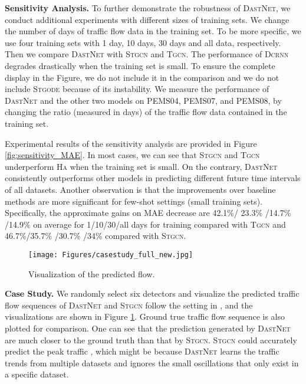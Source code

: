 \documentclass[sigconf]{acmart}
\theoremstyle{definition}
\begin{document}
\noindent\textbf{Sensitivity Analysis.}
To further demonstrate the robustness of \textsc{DastNet}, we conduct additional experiments with different sizes of training sets. We change the number of days of traffic flow data in the training set. To be more specific, we use four training sets with 1 day, 10 days, 30 days and all data, respectively. Then we compare \textsc{DastNet} with \textsc{Stgcn} and \textsc{Tgcn}. The performance of \textsc{Dcrnn} degrades drastically when the training set is small. To ensure the complete display in the Figure, we do not include it in the comparison and we do not include \textsc{Stgode} because of its instability.
We measure the performance of \textsc{DastNet} and the other two models on PEMS04, PEMS07, and PEMS08, by changing the ratio (measured in days) of the traffic flow data contained in the training set. 

Experimental results of the sensitivity analysis are provided in Figure \ref{fig:sensitivity_MAE}. In most cases, we can see that \textsc{Stgcn} and \textsc{Tgcn} underperform \textsc{Ha} when the training set is small. On the contrary, \textsc{DastNet} consistently outperforms other models in predicting different future time intervals of all datasets. Another observation is that the improvements over baseline methods are more significant for few-shot settings (small training sets). Specifically, the approximate gains on MAE decrease are 42.1\%/ 23.3\% /14.7\% /14.9\% on average for 1/10/30/all days for training compared with \textsc{Tgcn} and 46.7\%/35.7\% /30.7\% /34\% compared with \textsc{Stgcn}. 





\begin{figure}[h]
    \centering
    \texttt{[image: Figures/casestudy\_full\_new.jpg]}
    \caption{Visualization of the predicted flow.}
    \label{fig:casestudy}
\end{figure}


\noindent\textbf{Case Study.}
We randomly select six detectors and visualize the predicted traffic flow sequences of \textsc{DastNet} and \textsc{Stgcn} follow the setting in \cite{fang2021spatial}, and the visualizations are shown in Figure \ref{fig:casestudy}. Ground true traffic flow sequence is also plotted for comparison. One can see that the prediction generated by \textsc{DastNet} are much closer to the ground truth than that by \textsc{Stgcn}. \textsc{Stgcn} could accurately predict the peak traffic , which might be because \textsc{DastNet} learns the traffic trends from multiple datasets and ignores the small oscillations that only exist in a specific dataset.
\end{document}
